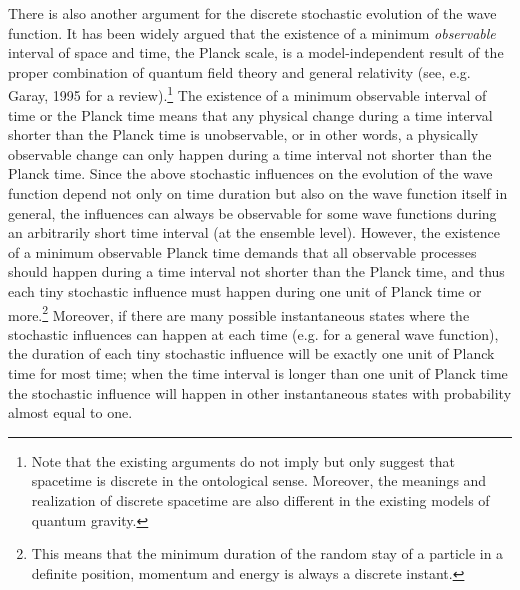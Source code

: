 There is also another argument for the discrete stochastic evolution of the wave function. It has been widely argued that the existence of a minimum \emph{observable} interval of space and time, the Planck scale, is a model-independent result of the proper combination of quantum field theory and general relativity (see, e.g. Garay, 1995 for a review).\footnote{Note that the existing arguments do not imply but only suggest that spacetime is discrete in the ontological sense. Moreover, the meanings and realization of discrete spacetime are also different in the existing models of quantum gravity.} The existence of a minimum observable interval of time or the Planck time means that any physical change during a time interval shorter than the Planck time is unobservable, or in other words, a physically observable change can only happen during a time interval not shorter than the Planck time. Since the above stochastic influences on the evolution of the wave function depend not only on time duration but also on the wave function itself in general, the influences can always be observable for some wave functions during an arbitrarily short time interval (at the ensemble level). However, the existence of a minimum observable Planck time demands that all observable processes should happen during a time interval not shorter than the Planck time, and thus each tiny stochastic influence must happen during one unit of Planck time or more.\footnote{This means that the minimum duration of the random stay of a particle in a definite position, momentum and energy is always a discrete instant.}
Moreover, if there are many possible instantaneous states where the stochastic influences can happen at each time (e.g. for a general wave function), the duration of each tiny stochastic influence will be exactly one unit of Planck time for most time; when the time interval is longer than one unit of Planck time the stochastic influence will happen in other instantaneous states with probability almost equal to one.

